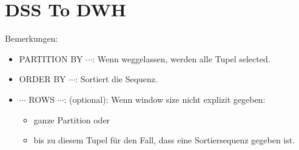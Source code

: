 
\section{DSS To DWH}

\begin{breakbox}

Bemerkungen:
\begin{itemize}
	\item PARTITION BY $\cdots$: Wenn weggelassen, werden alle Tupel selected.
	\item ORDER BY $\cdots$: Sortiert die Sequenz.
	\item $\cdots$ ROWS $\cdots$: (optional): Wenn window size nicht explizit gegeben:
		\begin{itemize}
			\item ganze Partition oder
			\item bis zu diesem Tupel für den Fall, dass eine Sortiersequenz gegeben ist.
		\end{itemize}
\end{itemize}
\end{breakbox}

\begin{breakbox}

\end{breakbox}

\begin{breakbox}

\end{breakbox}

\begin{breakbox}

\end{breakbox}

\begin{breakbox}

\end{breakbox}
